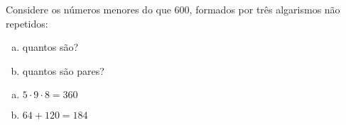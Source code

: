 \begin{ex}
 Considere os números menores do que 600, formados por três algarismos não repetidos:
    \begin{enumerate}[(a)]
    \item quantos são?
    \item quantos são pares?
    \end{enumerate}
     \begin{sol}
       \phantom{A} 
       \begin{enumerate} [(a)]
           \item \(5\cdot9\cdot8=360\) 
           \item \(64+120=184\)
          
           
       \end{enumerate}
     \end{sol}
\end{ex}